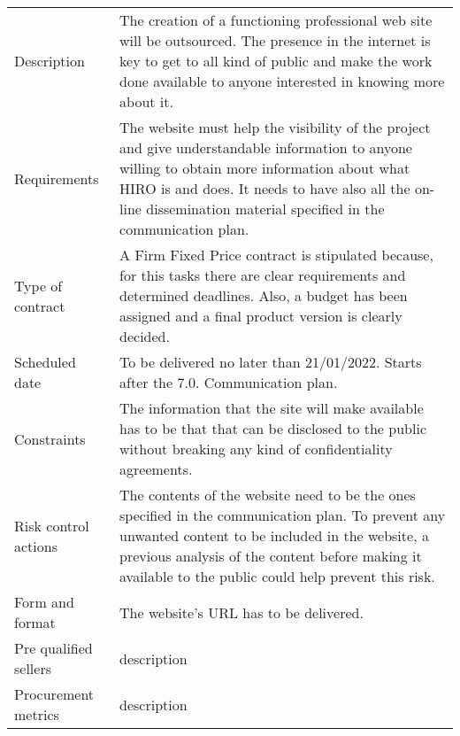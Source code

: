 \begin{table}[H]
	\centering
	\begin{tabular}
		{>{\raggedright\arraybackslash}p{3cm} >{\arraybackslash}p{11cm}}
		
		\toprule[2pt]
		
		\multicolumn{2}{c}{\textbf{SOW - 7.2.1. Web site development}}\\
		
		\midrule[1.5pt]
		
		Description & The creation of a functioning professional web site will be outsourced. The presence in the internet is key to get to all kind of public and make the work done available to anyone interested in knowing more about it. \\
		\hline
		
		Requirements & The website must help the visibility of the project and give understandable information to anyone willing to obtain more information about what HIRO is and does. It needs to have also all the on-line dissemination material specified in the communication plan.\\
		\hline
		
		Type of contract & A Firm Fixed Price contract is stipulated because, for this tasks there are clear requirements and determined deadlines. Also, a budget has been assigned and a final product version is clearly decided.\\
		\hline
		
		Scheduled date & To be delivered no later than 21/01/2022. Starts after the 7.0. Communication plan.\\
		\hline
		
		Constraints & The information that the site will make available has to be that that can be disclosed to the public without breaking any kind of confidentiality agreements.\\
		\hline
		
		Risk control actions & The contents of the website need to be the ones specified in the communication plan. To prevent any unwanted content to be included in the website, a previous analysis of the content before making it available to the public could help prevent this risk.\\
		\hline
		
		Form and format & The website's URL has to be delivered.\\
		\hline
		
		Pre qualified sellers & description\\
		\hline
		
		Procurement metrics & description\\
		
		\bottomrule[2pt]		
		
	\end{tabular}
\end{table}

